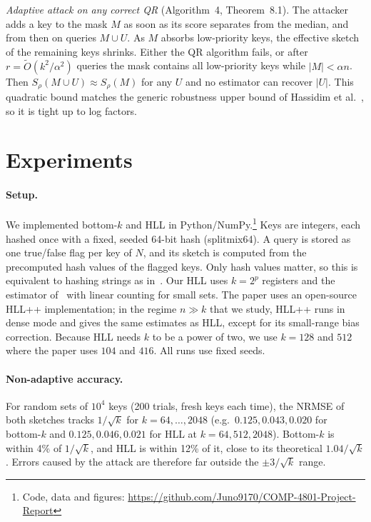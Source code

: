\documentclass{cccg20}
\begin{document}
\emph{Adaptive attack on any correct QR} (Algorithm~4, Theorem~8.1). The attacker adds a key to the mask $M$ as soon as its score separates from the median, and from then on queries $M\cup U$. As $M$ absorbs low-priority keys, the effective sketch of the remaining keys shrinks. Either the QR algorithm fails, or after $r=\tilde O(k^2/\alpha^2)$ queries the mask contains all low-priority keys while $|M|<\alpha n$. Then $S_\rho(M\cup U)\approx S_\rho(M)$ for any $U$ and no estimator can recover $|U|$. This quadratic bound matches the generic robustness upper bound of Hassidim et al.~\cite{hassidim2020}, so it is tight up to log factors.

\section{Experiments}

\paragraph{Setup.}
We implemented bottom-$k$ and HLL in Python/NumPy.\footnote{Code, data and figures: \url{https://github.com/Juno9170/COMP-4801-Project-Report}} Keys are integers, each hashed once with a fixed, seeded 64-bit hash (splitmix64). A query is stored as one true/false flag per key of $N$, and its sketch is computed from the precomputed hash values of the flagged keys. Only hash values matter, so this is equivalent to hashing strings as in~\cite{ahmadian2024}. Our HLL uses $k=2^p$ registers and the estimator of~\cite{flajolet2007} with linear counting for small sets. The paper uses an open-source HLL++ implementation; in the regime $n\gg k$ that we study, HLL++ runs in dense mode and gives the same estimates as HLL, except for its small-range bias correction. Because HLL needs $k$ to be a power of two, we use $k=128$ and $512$ where the paper uses $104$ and $416$. All runs use fixed seeds.

\paragraph{Non-adaptive accuracy.}
For random sets of $10^4$ keys (200 trials, fresh keys each time), the NRMSE of both sketches tracks $1/\sqrt{k}$ for $k=64,\dots,2048$ (e.g.\ $0.125, 0.043, 0.020$ for bottom-$k$ and $0.125, 0.046, 0.021$ for HLL at $k=64, 512, 2048$). Bottom-$k$ is within 4\% of $1/\sqrt{k}$, and HLL is within 12\% of it, close to its theoretical $1.04/\sqrt{k}$. Errors caused by the attack are therefore far outside the $\pm 3/\sqrt{k}$ range.
\end{document}
